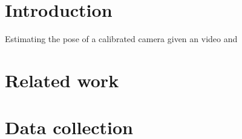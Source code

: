 \documentclass[10pt,twocolumn,letterpaper]{article}
\begin{document}
\section{Introduction}
Estimating the pose of a calibrated camera given an video and 



\section{Related work}


\section{Data collection}
\end{document}
